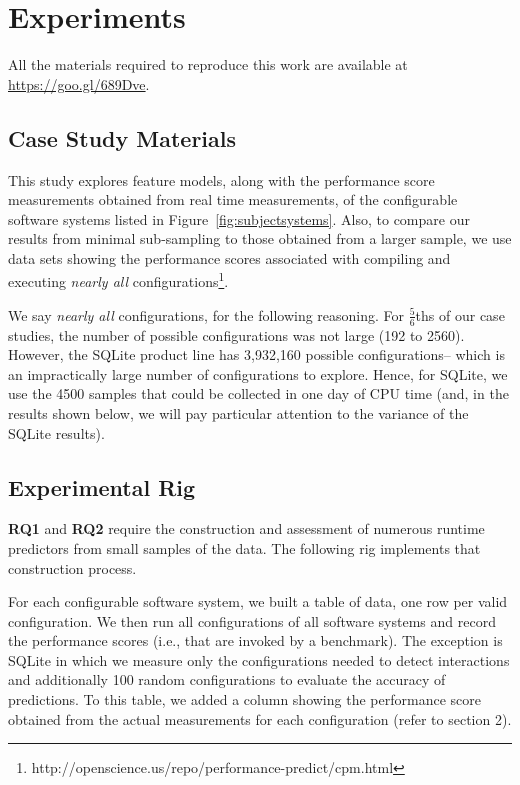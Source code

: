\documentclass{sig-alternative}
\newcommand{\fig}[1]{Figure~\ref{fig:#1}}
\begin{document}
\section{Experiments}


All the materials required to reproduce this work are available at \url{https://goo.gl/689Dve}.

\subsection{Case Study Materials}

This study explores feature models, along with the performance score measurements obtained from real time measurements, of the configurable software systems listed in \fig{subjectsystems}.
Also, to compare our results from minimal sub-sampling to those obtained 
from a larger sample, we use data sets showing the performance scores associated with
compiling and executing {\em nearly all} configurations\footnote{http://openscience.us/repo/performance-predict/cpm.html}.

We say {\em nearly all} configurations, for the following reasoning. For 
$\frac{5}{6}$ths of our case studies, the number of possible configurations
was not large (192 to 2560). However, the SQLite product line has 3,932,160 
possible configurations-- which is an impractically large number of configurations to explore. Hence, for SQLite, we use the 4500 samples that could
be collected in one day of CPU time (and, in the results shown below,
we will pay particular attention to the variance of the SQLite results).

\subsection{Experimental Rig}


{\bf RQ1} and {\bf RQ2} require the construction and assessment of numerous runtime predictors from small samples
of the data. The following rig implements that construction process.

For each configurable software system, we built a table of data, one row per valid configuration. We then run all configurations of all software systems
and record the performance scores (i.e., that are invoked by a benchmark).
The exception is SQLite in which we measure only the
configurations needed to detect interactions and additionally
100 random configurations to evaluate the accuracy of
predictions.  
To this table, we added a column showing the performance score obtained from the actual measurements for each configuration (refer to section 2).
\end{document}
